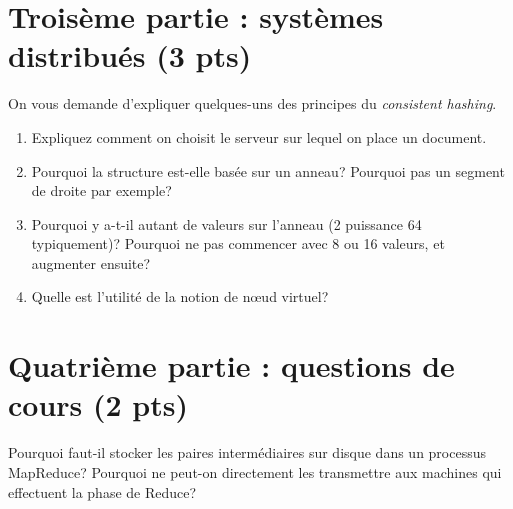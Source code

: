 \documentclass[11pt,a4paper]{article}
\begin{document}
\section*{Troisème partie : systèmes distribués (3 pts)}

On vous demande d'expliquer quelques-uns des principes du \textit{consistent hashing}. 

\begin{enumerate}
   \item Expliquez comment on choisit le serveur sur lequel on place un document.
  \item Pourquoi la structure est-elle basée sur un anneau? Pourquoi pas un segment de droite par exemple?
  \item Pourquoi y a-t-il autant de valeurs sur l'anneau (2 puissance 64 typiquement)? Pourquoi ne pas commencer
      avec 8 ou 16 valeurs, et augmenter ensuite?
   \item Quelle est l'utilité de la notion de n{\oe}ud virtuel?
\end{enumerate}

\section*{Quatrième partie : questions de cours (2 pts)}

 Pourquoi faut-il stocker les paires intermédiaires sur disque dans un processus
 MapReduce? Pourquoi ne peut-on directement les transmettre aux machines qui effectuent
 la phase de Reduce?
 
\end{document}
